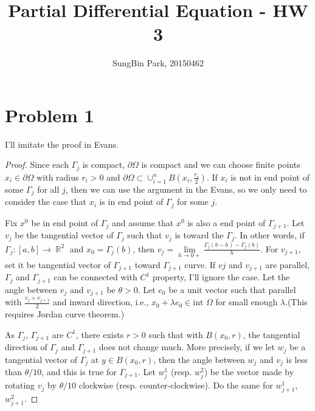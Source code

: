 \documentclass{article}
\DeclareMathOperator{\rr}{\mathbb{R}}
\begin{document}
\title{Partial Differential Equation - HW 3}
\author{SungBin Park, 20150462} 

 \maketitle

\section*{Problem 1}
I'll imitate the proof in Evans.
\begin{proof}
Since each $\Gamma_j$ is compact, $\partial \Omega$ is compact and we can choose finite points $x_i\in \partial \Omega$ with radius $r_i>0$ and $\partial \Omega\subset \cup_{i=1}^n B\left(x_i, \frac{r_i}{2}\right)$. If $x_i$ is not in end point of some $\Gamma_j$ for all $j$, then we can use the argument in the Evans, so we only need to consider the case that $x_i$ is in end point of $\Gamma_j$ for some $j$.

Fix $x^0$ be in end point of $\Gamma_j$ and assume that $x^0$ is also a end point of $\Gamma_{j+1}$. Let $v_{j}$ be the tangential vector of $\Gamma_j$ such that $v_j$ is toward the $\Gamma_j$. In other words, if $\Gamma_j:[a,b]\rightarrow \rr^2$ and $x_0=\Gamma_j(b)$, then $v_j=\lim\limits_{h\rightarrow 0+}\frac{\Gamma_j(b-h)-\Gamma_j(b)}{h}$. For $v_{j+1}$, set it be tangential vector of $\Gamma_{j+1}$ toward $\Gamma_{j+1}$ curve. If $v{j}$ and $v_{j+1}$ are parallel, $\Gamma_j$ and $\Gamma_{j+1}$ can be connected with $C^1$ property, I'll ignore the case. Let the angle between $v_j$ and $v_{j+1}$ be $\theta>0$. Let $e_0$ be a unit vector such that parallel with $\frac{v_j+v_{j+1}}{2}$ and inward direction, i.e., $x_0+\lambda e_0\in \text{int }\Omega$ for small enough $\lambda$.(This requires Jordan curve theorem.)

As $\Gamma_j$, $\Gamma_{j+1}$ are $C^1$, there exists $r>0$ such that with $B(x_0, r)$, the tangential direction of $\Gamma_j$ and $\Gamma_{j+1}$ does not change much. More precisely, if we let $w_j$ be a tangential vector of $\Gamma_j$ at $y\in B(x_0, r)$, then the angle between $w_j$ and $v_j$ is less than $\theta/10$, and this is true for $\Gamma_{j+1}$. Let $w^1_j$ (resp. $w^2_j$) be the vector made by rotating $v_j$ by $\theta/10$ clockwise (resp. counter-clockwise). Do the same for $w^1_{j+1}$, $w^2_{j+1}$.


\end{proof}
\end{document}
